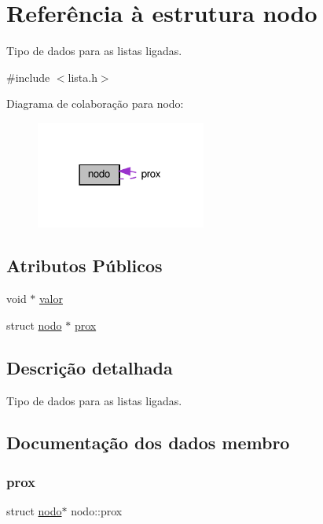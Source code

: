 \hypertarget{structnodo}{}\section{Referência à estrutura nodo}
\label{structnodo}


Tipo de dados para as listas ligadas.  




{\ttfamily \#include $<$lista.\+h$>$}



Diagrama de colaboração para nodo\+:\nopagebreak
\begin{figure}[H]
\begin{center}
\leavevmode
\includegraphics[width=158pt]{structnodo__coll__graph}
\end{center}
\end{figure}
\subsection*{Atributos Públicos}
\begin{DoxyCompactItemize}
\item 
void $\ast$ \hyperlink{structnodo_ab63adcdb83ea1fdcf4fa10f3cafc4a6a}{valor}
\item 
struct \hyperlink{structnodo}{nodo} $\ast$ \hyperlink{structnodo_a086547621a7da23b916bbe26e0855308}{prox}
\end{DoxyCompactItemize}


\subsection{Descrição detalhada}
Tipo de dados para as listas ligadas. 

\subsection{Documentação dos dados membro}
\mbox{\label{structnodo_a086547621a7da23b916bbe26e0855308}} 
\subsubsection{\texorpdfstring{prox}{prox}}
{\footnotesize\ttfamily struct \hyperlink{structnodo}{nodo}$\ast$ nodo\+::prox}

